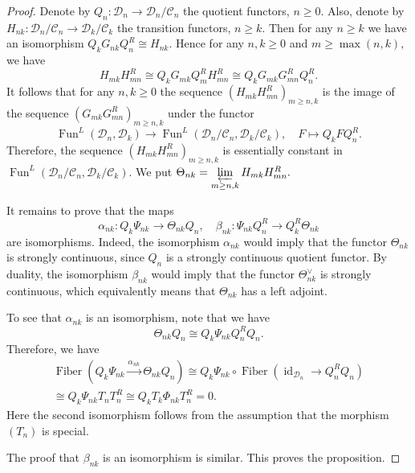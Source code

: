 \documentclass[11pt,leqno]{amsart}
\numberwithin{equation}{section}
\newcommand{\prolim}[1][]{\mathop{\varprojlim}\limits_{#1}}
\newcommand{\xto}{\xrightarrow}
\newcommand{\Fiber}{\operatorname{Fiber}}
\newcommand{\cD}{{\mathcal D}}
\newcommand{\cC}{{\mathcal C}}
\newcommand{\Fun}{\operatorname{Fun}}
\newcommand{\id}{\operatorname{id}}
\begin{document}
\begin{proof}
Denote by $Q_n:\cD_n\to\cD_n/\cC_n$ the quotient functors, $n\geq 0.$ Also, denote by $H_{nk}:\cD_n/\cC_n\to\cD_k/\cC_k$ the transition functors, $n\geq k.$  
Then for any $n\geq k$ we have an isomorphism $Q_k G_{nk}Q_n^R\cong H_{nk}.$ Hence for any $n,k\geq 0$ and $m\geq \max(n,k),$ we have
\begin{equation*}
H_{mk}H_{mn}^R\cong Q_k G_{mk} Q_m^R H_{mn}^R\cong Q_k G_{mk} G_{mn}^R Q_n^R.
\end{equation*}
It follows that for any $n,k\geq 0$ the sequence $(H_{mk}H_{mn}^R)_{m\geq n,k}$ is the image of the sequence $(G_{mk}G_{mn}^R)_{m\geq n,k}$ under the functor
\begin{equation*}
\Fun^L(\cD_n,\cD_k)\to \Fun^L(\cD_n/\cC_n,\cD_k/\cC_k),\quad F\mapsto Q_k F Q_n^R.
\end{equation*}
Therefore, the sequence $(H_{mk}H_{mn}^R)_{m\geq n,k}$ is essentially constant in $\Fun^L(\cD_n/\cC_n,\cD_k/\cC_k).$ We put $\Theta_{nk}=\prolim[m\geq n,k]H_{mk}H_{mn}^R.$

It remains to prove that the maps
\begin{equation*}
\alpha_{nk}:Q_k \Psi_{nk}\to \Theta_{nk} Q_n,\quad \beta_{nk}:\Psi_{nk}Q_n^R\to Q_k^R \Theta_{nk}
\end{equation*}
are isomorphisms. Indeed, the isomorphism $\alpha_{nk}$ would imply that the functor $\Theta_{nk}$ is strongly continuous, since $Q_n$ is a strongly continuous quotient functor. By duality, the isomorphism $\beta_{nk}$ would imply that the functor $\Theta_{nk}^{\vee}$ is strongly continuous, which equivalently means that $\Theta_{nk}$ has a left adjoint.

To see that $\alpha_{nk}$ is an isomorphism, note that we have
\begin{equation*}
\Theta_{nk}Q_n\cong Q_k \Psi_{nk} Q_n^R Q_n. 
\end{equation*}
Therefore, we have
\begin{multline*}
\Fiber(Q_k\Psi_{nk}\xto{\alpha_{nk}} \Theta_{nk} Q_n)\cong Q_k\Psi_{nk}\circ \Fiber(\id_{\cD_n}\to Q_n^R Q_n)\\
\cong Q_k\Psi_{nk} T_n T_n^R\cong Q_k T_k \Phi_{nk} T_n^R = 0.
\end{multline*}
Here the second isomorphism follows from the assumption that the morphism $(T_n)$ is special. 

The proof that $\beta_{nk}$ is an isomorphism is similar. This proves the proposition.\end{proof}
\end{document}
